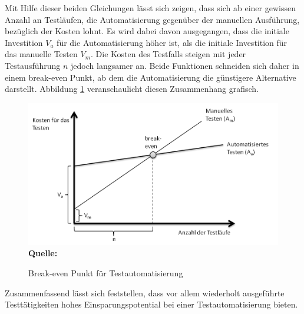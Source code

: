 Mit Hilfe dieser beiden Gleichungen lässt sich zeigen, dass sich ab einer gewissen Anzahl an Testläufen, die Automatisierung gegenüber der manuellen Ausführung, bezüglich der Kosten lohnt.
Es wird dabei davon ausgegangen, dass die initiale Investition \(V_a\) für die Automatisierung höher ist, als die initiale Investition für das manuelle Testen \(V_m\).
Die Kosten des Testfalls steigen mit jeder Testausführung \(n\) jedoch langsamer an. Beide Funktionen schneiden sich daher in einem break-even Punkt, ab dem die Automatisierung die günstigere Alternative darstellt.
Abbildung \ref{fig:breakEven} veranschaulicht diesen Zusammenhang grafisch.

\begin{figure}[htb]
  \centering  
  \includegraphics[scale=0.8]{img/breakeven.png}\\
  \footnotesize\sffamily\textbf{Quelle:} \cite{ramler_economic_2006}
  \caption{Break-even Punkt für Testautomatisierung}
  \label{fig:breakEven}
\end{figure}

Zusammenfassend lässt sich feststellen, dass vor allem wiederholt ausgeführte Testtätigkeiten hohes Einsparungspotential bei einer Testautomatisierung bieten.


